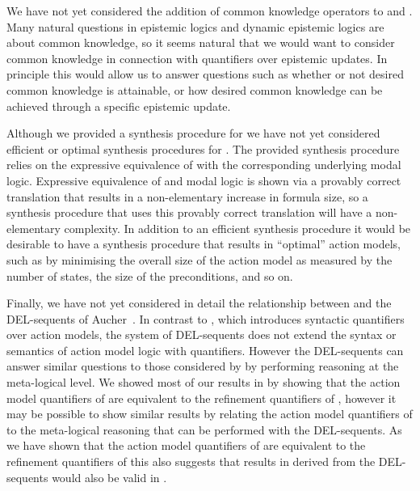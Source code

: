 We have not yet considered the addition of common knowledge operators to \logicRml{} and \logicAaml{}.
Many natural questions in epistemic logics and dynamic epistemic logics are about common knowledge, so it seems natural that we would want to consider common knowledge in connection with quantifiers over epistemic updates.
In principle this would allow us to answer questions such as whether or not desired common knowledge is attainable, or how desired common knowledge can be achieved through a specific epistemic update.

Although we provided a synthesis procedure for \logicAaml{} we have not yet considered efficient or optimal synthesis procedures for \logicAaml{}.
The provided synthesis procedure relies on the expressive equivalence of \logicAaml{} with the corresponding underlying modal logic.
Expressive equivalence of \logicAaml{} and modal logic is shown via a provably correct translation that results in a non-elementary increase in formula size, so a synthesis procedure that uses this provably correct translation will have a non-elementary complexity.
In addition to an efficient synthesis procedure it would be desirable to have a synthesis procedure that results in ``optimal'' action models, such as by minimising the overall size of the action model as measured by the number of states, the size of the preconditions, and so on.

Finally, we have not yet considered in detail the relationship between \logicAaml{} and the DEL-sequents of Aucher~\cite{aucher:2011,aucher:2012}.
In contrast to \logicAaml{}, which introduces syntactic quantifiers over action models, the system of DEL-sequents does not extend the syntax or semantics of action model logic with quantifiers.
However the DEL-sequents can answer similar questions to those considered by \logicAaml{} by performing reasoning at the meta-logical level.
We showed most of our results in \logicAaml{} by showing that the action model quantifiers of \logicAaml{} are equivalent to the refinement quantifiers of \logicRml{}, however it may be possible to show similar results by relating the action model quantifiers of \logicAaml{} to the meta-logical reasoning that can be performed with the DEL-sequents.
As we have shown that the action model quantifiers of \logicAaml{} are equivalent to the refinement quantifiers of \logicRml{} this also suggests that results in \logicAaml{} derived from the DEL-sequents would also be valid in \logicRml{}.
